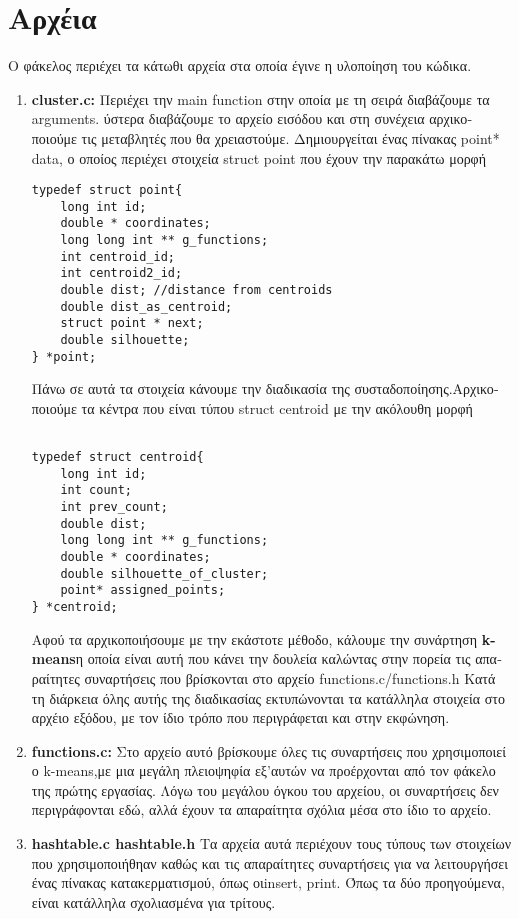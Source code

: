 \documentclass{article}
\begin{document}
\section{ \textgreek{Αρχέια}}
\textgreek{Ο φάκελος περιέχει τα κάτωθι αρχεία στα οποία έγινε η υλοποίηση του κώδικα.}
\begin{enumerate}
\item\textbf{ cluster.c:} \textgreek{Περιέχει την} main function \textgreek{ στην οποία με τη σειρά διαβάζουμε τα }arguments. \textgreek{ύστερα διαβάζουμε το αρχείο εισόδου και στη συνέχεια αρχικοποιούμε τις μεταβλητές που θα χρειαστούμε.
Δημιουργείται ένας πίνακας }point* data, \textgreek{ο οποίος περιέχει στοιχεία} struct point  \textgreek{που έχουν την παρακάτω μορφή}
\begin{verbatim}
typedef struct point{
	long int id;
	double * coordinates;
	long long int ** g_functions;
	int centroid_id;
	int centroid2_id;
	double dist; //distance from centroids
	double dist_as_centroid;
	struct point * next;
	double silhouette;
} *point;
\end{verbatim}

\textgreek{Πάνω σε αυτά τα στοιχεία κάνουμε την διαδικασία της συσταδοποίησης.}\textgreek{Αρχικοποιούμε τα κέντρα που είναι τύπου} struct centroid \textgreek{με την ακόλουθη μορφή}
\begin{verbatim}

typedef struct centroid{
	long int id;
	int count;
	int prev_count;
	double dist;
	long long int ** g_functions;
	double * coordinates;
	double silhouette_of_cluster;
	point* assigned_points;
} *centroid;

\end{verbatim}
\textgreek{Αφού τα αρχικοποιήσουμε με την εκάστοτε μέθοδο, κάλουμε την συνάρτηση} \textbf{k-means}\textgreek{η οποία είναι αυτή που κάνει την δουλεία καλώντας στην πορεία τις απαραίτητες συναρτήσεις που βρίσκονται στο αρχείο }functions.c/functions.h \textgreek{Κατά τη διάρκεια όλης αυτής της διαδικασίας εκτυπώνονται τα κατάλληλα στοιχεία στο αρχέιο εξόδου, με τον ίδιο τρόπο που περιγράφεται και στην εκφώνηση.}

\item \textbf{functions.c:} \textgreek{Στο αρχείο αυτό βρίσκουμε όλες τις συναρτήσεις που χρησιμοποιεί ο }k-means,\textgreek{με μια μεγάλη πλειοψηφία εξ'αυτών να προέρχονται από τον φάκελο της πρώτης εργασίας. Λόγω του μεγάλου όγκου του αρχείου, οι συναρτήσεις δεν περιγράφονται εδώ, αλλά έχουν τα απαραίτητα σχόλια μέσα στο ίδιο το αρχείο.}
\item{\textbf{hashtable.c hashtable.h}} \textgreek{Τα αρχεία αυτά περιέχουν τους τύπους των στοιχείων που χρησιμοποιήθηαν καθώς και τις απαραίτητες συναρτήσεις για να λειτουργήσει ένας πίνακας κατακερματισμού, όπως οι}insert, print. \textgreek{Όπως τα δύο προηγούμενα, είναι κατάλληλα σχολιασμένα για τρίτους.}


\end{enumerate}
\end{document}
